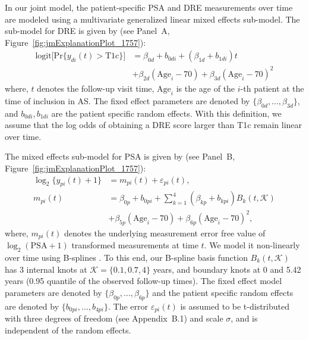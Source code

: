 In our joint model, the patient-specific PSA and DRE measurements over time are modeled using a multivariate generalized linear mixed effects sub-model. The sub-model for DRE is given by (see Panel~A, Figure~\ref{fig:jmExplanationPlot_1757}):
\begin{equation}
\label{eq:long_model_dre}
\begin{split}
    \mbox{logit} \big[\mbox{Pr}\{y_{di}(t) > \mbox{T1c}\}\big] &= \beta_{0d} + b_{0di} + (\beta_{1d} + b_{1di}) t\\
    &+ \beta_{2d} (\mbox{Age}_i-70) + \beta_{3d} (\mbox{Age}_i-70)^2
    \end{split}
\end{equation}
where, $t$ denotes the follow-up visit time, $\mbox{Age}_i$ is the age of the $i$-th patient at the time of inclusion in AS. The fixed effect parameters are denoted by $\{\beta_{0d}, \ldots, \beta_{3d}\}$, and $b_{0di}, b_{1di}$ are the patient specific random effects. With this definition, we assume that the log odds of obtaining a DRE score larger than T1c remain linear over time. 

The mixed effects sub-model for PSA is given by (see Panel~B, Figure~\ref{fig:jmExplanationPlot_1757}):
\begin{equation}
\label{eq:long_model_psa}
\begin{split}
    \log_2 \big\{y_{pi}(t) + 1\big\} &= m_{pi}(t) + \varepsilon_{pi}(t),\\
    m_{pi}(t) &= \beta_{0p} + b_{0pi} + \sum_{k=1}^4 (\beta_{kp} + b_{kpi})  B_k(t,\mathcal{K})\\ 
    &+ \beta_{5p} (\mbox{Age}_i-70) + \beta_{6p} (\mbox{Age}_i-70)^2,
    \end{split}
\end{equation}
where, $m_{pi}(t)$ denotes the underlying measurement error free value of $\log_2 (\mbox{PSA} + 1)$ transformed \citep{pearson1994mixed,lin2000latent} measurements at time $t$. We model it non-linearly over time using B-splines \citep{de1978practical}. To this end, our B-spline basis function $B_k(t, \mathcal{K})$ has 3 internal knots at $\mathcal{K} = \{0.1, 0.7, 4\}$ years, and boundary knots at 0 and 5.42 years (0.95 quantile of the observed follow-up times). The fixed effect model parameters are denoted by $\{\beta_{0p},\ldots,\beta_{6p}\}$ and the patient specific random effects are denoted by $\{b_{0pi}, \ldots, b_{4pi}\}$. The error $\varepsilon_{pi}(t)$ is assumed to be t-distributed with three degrees of freedom (see Appendix~B.1) and scale $\sigma$, and is independent of the random effects. 

